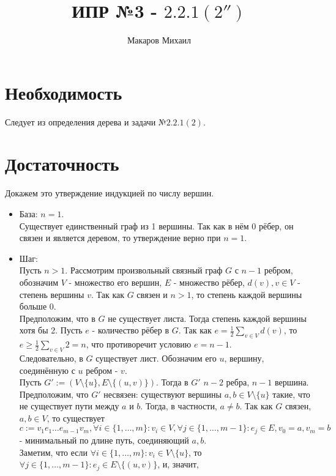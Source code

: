 \documentclass{article}
\title{ИПР №3 - $2.2.1(2'')$}
\author{Макаров Михаил}
\date{}
\newcommand{\range}[2]{
    \{#1, \ldots, #2 \}
}
\begin{document}
	\maketitle
    \section{Необходимость}
    Следует из определения дерева и задачи №$2.2.1(2)$.
    \section{Достаточность}
    Докажем это утверждение индукцией по числу вершин.\\
    \begin{itemize}
    \item База: $n = 1$.\\
    Существует единственный граф из 1 вершины. Так как в нём 0 рёбер, он связен и является деревом, то утверждение верно
    при $n = 1$.
    \item Шаг:\\
    Пусть $n > 1$. Рассмотрим произвольный связный граф $G$ с $n - 1$ ребром, обозначим $V$ - множество его вершин,
    $E$ - множество рёбер, $d(v), v \in V$ - степень вершины $v$. 
    Так как $G$ связен и $n > 1$, то степень каждой вершины больше 0.\\
    Предположим, что в $G$ не существует листа. Тогда степень каждой вершины хотя бы 2. Пусть $e$ - количество рёбер
    в $G$. Так как $e = \frac{1}{2} \sum\limits_{v \in V} d(v)$, то $e \ge \frac{1}{2} \sum\limits_{v \in V} 2 = n$, что 
    противоречит условию $e = n - 1$.\\
    Следовательно, в $G$ существует лист. Обозначим его $u$, вершину, соединённую с $u$ ребром - $v$.\\
    Пусть $G' := (V \setminus \{u\}, E \setminus \{ (u, v) \}) $. Тогда в $G'$ $n - 2$ ребра, $n - 1$ вершина.\\
    Предположим, что $G'$ несвязен: существуют вершины $a, b \in V \setminus \{u\}$ такие, что не существует пути 
    между $a$ и $b$. Тогда, в частности, $a \neq b$. Так как $G$ связен, $a, b \in V$, то существует 
    $c := v_1e_1\ldots e_{m - 1}v_m, \forall i \in \range{1}{m}: v_i \in V, \forall j \in \range{1}{m - 1}: e_j \in E, v_0 = a, v_m = b $ - минимальный по длине путь, соединяющий $a, b$.\\
     Заметим, что если $\forall i \in \range{1}{m}: v_i \in V \setminus \{u\}$, то 
     $\forall j \in \range{1}{m - 1}: e_j \in E \setminus \{ (u, v) \} $, и, значит,

\end{itemize}
\end{document}
